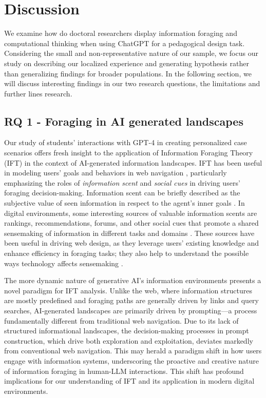 \documentclass[sn-mathphys, Numbered]{sn-jnl}%
\theoremstyle{thmstyleone}%
\theoremstyle{thmstyletwo}%
\theoremstyle{thmstylethree}%
\begin{document}
\section{Discussion}\label{Discussion}

We examine how do doctoral researchers display information foraging and computational thinking when using ChatGPT for a pedagogical design task. Considering the small and non-representative nature of our sample, we focus our study on describing our localized experience and generating hypothesis rather than generalizing findings for broader populations.  In the following section, we will discuss interesting findings in our two research questions, the limitations and further lines research.

\subsection*{RQ 1 - Foraging in AI generated landscapes}

Our study of students' interactions with GPT-4 in creating personalized case scenarios offers fresh insight to the application of Information Foraging Theory (IFT) in the context of AI-generated information landscapes. IFT has been useful in modeling users' goals and behaviors in web navigation \parencite{pirolli_rational_2005, pirolli_information_2007}, particularly emphasizing the roles of \textit{information scent} \parencite{spool1998web, pirolli_effects_2003,chi_scent_2000} and \textit{social cues} \parencite{sundar_news_2007, held_using_2010, muralidharan_social_2012} in driving users' foraging decision-making. Information scent can be briefly described as the subjective value of seen information in respect to the agent's inner goals \parencite{spool1998web, pirolli_computational_1997}. In digital environments, some interesting sources of valuable information scents are rankings, recommendations, forums, and other social cues that promote a shared sensemaking of information in different tasks and domains \parencite{fisher_distributed_2012, kittur_standing_2014}. These sources have been useful in driving web design, as they leverage users' existing knowledge and enhance efficiency in foraging tasks; they also help to understand the possible ways technology affects sensemaking \parencite{russell_cost_1993, kittur_costs_2013, pirolli_information_1999, chi_using_2001}.

The more dynamic nature of generative AI's information environments presents a novel paradigm for IFT analysis. Unlike the web, where information structures are mostly predefined and foraging paths are generally driven by links and query searches, AI-generated landscapes are primarily driven by prompting---a process fundamentally different from traditional web navigation. Due to its lack of structured informational landscapes, the decision-making processes in prompt construction, which drive both exploration and exploitation, deviates markedly from conventional web navigation. This may herald a paradigm shift in how users engage with information systems, underscoring the proactive and creative nature of information foraging in human-LLM interactions. This shift has profound implications for our understanding of IFT and its application in modern digital environments. 
\end{document}
